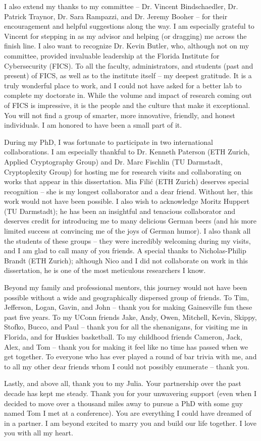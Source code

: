 I also extend my thanks to my committee -- Dr. Vincent Bindschaedler, Dr. Patrick Traynor, Dr. Sara Rampazzi, and Dr. Jeremy Booher -- for their encouragement and helpful suggestions along the way. I am especially grateful to Vincent for stepping in as my advisor and helping (or dragging) me across the finish line. I also want to recognize Dr. Kevin Butler, who, although not on my committee, provided invaluable leadership at the Florida Institute for Cybersecurity (FICS). To all the faculty, administrators, and students (past and present) of FICS, as well as to the institute itself -- my deepest gratitude. It is a truly wonderful place to work, and I could not have asked for a better lab to complete my doctorate in. While the volume and impact of research coming out of FICS is impressive, it is the people and the culture that make it exceptional. You will not find a group of smarter, more innovative, friendly, and honest individuals. I am honored to have been a small part of it.

During my PhD, I was fortunate to participate in two international collaborations. I am especially thankful to Dr. Kenneth Paterson (ETH Zurich, Applied Cryptography Group) and Dr. Marc Fischlin (TU Darmstadt, Cryptoplexity Group) for hosting me for research visits and collaborating on works that appear in this dissertation. Mia Filić (ETH Zurich) deserves special recognition -- she is my longest collaborator and a dear friend. Without her, this work would not have been possible. I also wish to acknowledge Moritz Huppert (TU Darmstadt); he has been an insightful and tenacious collaborator and deserves credit for introducing me to many delicious German beers (and his more limited success at convincing me of the joys of German humor). I also thank all the students of these groups -- they were incredibly welcoming during my visits, and I am glad to call many of you friends. A special thanks to Nicholas-Philip Brandt (ETH Zurich); although Nico and I did not collaborate on work in this dissertation, he is one of the most meticulous researchers I know.

Beyond my family and professional mentors, this journey would not have been possible without a wide and geographically dispersed group of friends. To Tim, Jefferson, Logan, Gavin, and John -- thank you for making Gainesville fun these past five years. To my UConn friends Jake, Andy, Owen, Mitchell, Kevin, Skippy, Stofko, Bucco, and Paul -- thank you for all the shenanigans, for visiting me in Florida, and for Huskies basketball. To my childhood friends Cameron, Jack, Alex, and Tom -- thank you for making it feel like no time has passed when we get together. To everyone who has ever played a round of bar trivia with me, and to all my other dear friends whom I could not possibly enumerate -- thank you.

Lastly, and above all, thank you to my Julia. Your partnership over the past decade has kept me steady. Thank you for your unwavering support (even when I decided to move over a thousand miles away to pursue a PhD with some guy named Tom I met at a conference). You are everything I could have dreamed of in a partner. I am beyond excited to marry you and build our life together. I love you with all my heart.